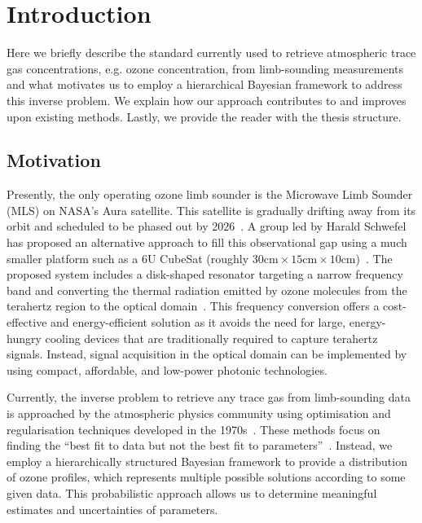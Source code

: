 \chapter{Introduction}

Here we briefly describe the standard currently used to retrieve atmospheric trace gas concentrations, e.g. ozone concentration, from limb-sounding measurements and what motivates us to employ a hierarchical Bayesian framework to address this inverse problem.
We explain how our approach contributes to and improves upon existing methods.
Lastly, we provide the reader with the thesis structure.

\section{Motivation}
Presently, the only operating ozone limb sounder is the Microwave Limb Sounder (MLS) on NASA's Aura satellite.
This satellite is gradually drifting away from its orbit and scheduled to be phased out by 2026~\cite{Bryan2024NASA}.
A group led by Harald Schwefel has proposed an alternative approach to fill this observational gap using a much smaller platform such as a 6U CubeSat (roughly $30\text{cm} \times 15\text{cm} \times 10\text{cm}$)~\cite{ustin2024current}. 
The proposed system includes a disk-shaped resonator targeting a narrow frequency band and converting the thermal radiation emitted by ozone molecules from the terahertz region to the optical domain~\cite{Suresh25,Sedlmeir14}. 
This frequency conversion offers a cost-effective and energy-efficient solution as it avoids the need for large, energy-hungry cooling devices that are traditionally required to capture terahertz signals. 
Instead, signal acquisition in the optical domain can be implemented by using compact, affordable, and low-power photonic technologies.

Currently, the inverse problem to retrieve any trace gas from limb-sounding data is approached by the atmospheric physics community using optimisation and regularisation techniques developed in the 1970s~\cite{rodgers1976retrieval, NASA2022MLSv5}.
These methods focus on finding the ``best fit to data but not the best fit to parameters''~\cite{tan2016LecNot}.
Instead, we employ a hierarchically structured Bayesian framework to provide a distribution of ozone profiles, which represents multiple possible solutions according to some given data.
This probabilistic approach allows us to determine meaningful estimates and uncertainties of parameters.

